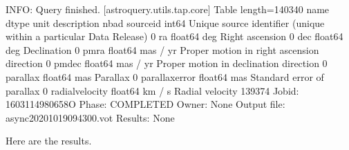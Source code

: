 \documentclass[letterpaper,10pt,english]{sphinxmanual}
\begin{document}
\begin{sphinxVerbatim}[commandchars=\\\{\}]
INFO: Query finished. [astroquery.utils.tap.core]
\PYGZlt{}Table length=140340\PYGZgt{}
      name       dtype    unit                              description                             n\PYGZus{}bad 
\PYGZhy{}\PYGZhy{}\PYGZhy{}\PYGZhy{}\PYGZhy{}\PYGZhy{}\PYGZhy{}\PYGZhy{}\PYGZhy{}\PYGZhy{}\PYGZhy{}\PYGZhy{}\PYGZhy{}\PYGZhy{}\PYGZhy{} \PYGZhy{}\PYGZhy{}\PYGZhy{}\PYGZhy{}\PYGZhy{}\PYGZhy{}\PYGZhy{} \PYGZhy{}\PYGZhy{}\PYGZhy{}\PYGZhy{}\PYGZhy{}\PYGZhy{}\PYGZhy{}\PYGZhy{} \PYGZhy{}\PYGZhy{}\PYGZhy{}\PYGZhy{}\PYGZhy{}\PYGZhy{}\PYGZhy{}\PYGZhy{}\PYGZhy{}\PYGZhy{}\PYGZhy{}\PYGZhy{}\PYGZhy{}\PYGZhy{}\PYGZhy{}\PYGZhy{}\PYGZhy{}\PYGZhy{}\PYGZhy{}\PYGZhy{}\PYGZhy{}\PYGZhy{}\PYGZhy{}\PYGZhy{}\PYGZhy{}\PYGZhy{}\PYGZhy{}\PYGZhy{}\PYGZhy{}\PYGZhy{}\PYGZhy{}\PYGZhy{}\PYGZhy{}\PYGZhy{}\PYGZhy{}\PYGZhy{}\PYGZhy{}\PYGZhy{}\PYGZhy{}\PYGZhy{}\PYGZhy{}\PYGZhy{}\PYGZhy{}\PYGZhy{}\PYGZhy{}\PYGZhy{}\PYGZhy{}\PYGZhy{}\PYGZhy{}\PYGZhy{}\PYGZhy{}\PYGZhy{}\PYGZhy{}\PYGZhy{}\PYGZhy{}\PYGZhy{}\PYGZhy{}\PYGZhy{}\PYGZhy{}\PYGZhy{}\PYGZhy{}\PYGZhy{}\PYGZhy{}\PYGZhy{}\PYGZhy{}\PYGZhy{} \PYGZhy{}\PYGZhy{}\PYGZhy{}\PYGZhy{}\PYGZhy{}\PYGZhy{}
      source\PYGZus{}id   int64          Unique source identifier (unique within a particular Data Release)      0
             ra float64      deg                                                    Right ascension      0
            dec float64      deg                                                        Declination      0
           pmra float64 mas / yr                         Proper motion in right ascension direction      0
          pmdec float64 mas / yr                             Proper motion in declination direction      0
       parallax float64      mas                                                           Parallax      0
 parallax\PYGZus{}error float64      mas                                         Standard error of parallax      0
radial\PYGZus{}velocity float64   km / s                                                    Radial velocity 139374
Jobid: 1603114980658O
Phase: COMPLETED
Owner: None
Output file: async\PYGZus{}20201019094300.vot
Results: None
\end{sphinxVerbatim}

Here are the results.

\begin{sphinxVerbatim}[commandchars=\\\{\}]
  
\end{sphinxVerbatim}
\end{document}
